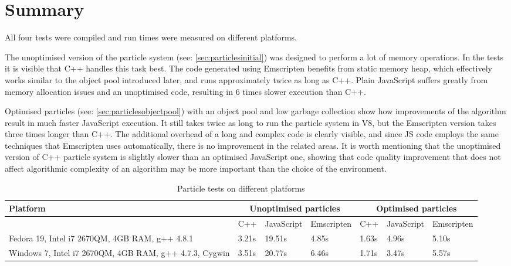 \chapter{Summary}
\label{cha:summary}

All four tests were compiled and run times were measured on different platforms.

The unoptimised version of the particle system (see: \ref{sec:particlesinitial}) was designed to perform a lot of memory operations. In the tests it is visible that C++ handles this task best. The code generated using Emscripten benefits from static memory heap, which effectively works similar to the object pool introduced later, and runs approximately twice as long as C++. Plain JavaScript suffers greatly from memory allocation issues and an unoptimised code, resulting in 6 times slower execution than C++.

Optimised particles (see: \ref{sec:particlesobjectpool}) with an object pool and low garbage collection show how improvements of the algorithm result in much faster JavaScript execution. It still takes twice as long to run the particle system in V8, but the Emscripten version takes three times longer than C++. The additional overhead of a long and complex code is clearly visible, and since JS code employs the same techniques that Emscripten uses automatically, there is no improvement in the related areas. It is worth mentioning that the unoptimised version of C++ particle system is slightly slower than an optimised JavaScript one, showing that code quality improvement that does not affect algorithmic complexity of an algorithm may be more important than the choice of the environment.

\begin{table}[h!]
\caption{Particle tests on different platforms}
\label{table:benchmarks}
\begin{tabular}{|p{4cm}||l|l|l||l|l|l|}
  	\hline
   Platform & \multicolumn{3}{c}{Unoptimised particles} & \multicolumn{3}{c}{Optimised particles}\\ \hline
   & C++ & JavaScript & Emscripten & C++ & JavaScript & Emscripten\\ \hline
   Fedora 19, Intel i7 2670QM, 4GB RAM, g++ 4.8.1 & 3.21s & 19.51s & 4.85s & 1.63s & 4.96s & 5.10s \\ \hline
   Windows 7, Intel i7 2670QM, 4GB RAM, g++ 4.7.3, Cygwin & 3.51s & 20.77s & 6.46s & 1.71s & 3.47s & 5.57s \\ \hline
\end{tabular}
\end{table}


